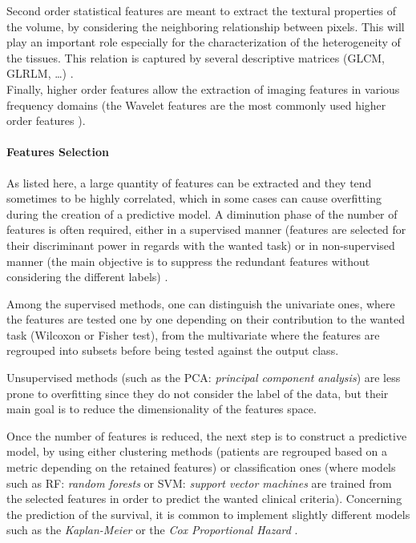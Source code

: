 \documentclass[]{article}
\let\oldparagraph\paragraph
\renewcommand{\paragraph}[1]{\oldparagraph{#1}\mbox{}}
\begin{document}
Second order statistical features are meant to extract the textural
properties of the volume, by considering the neighboring relationship
between pixels. This will play an important role especially for the
characterization of the heterogeneity of the tissues. This relation is
captured by several descriptive matrices (GLCM, GLRLM,
\ldots{}) \cite{Parekh2016}.\\
Finally, higher order features allow the extraction of imaging features
in various frequency domains (the Wavelet features are the most commonly
used higher order features \cite{Thawani2018}).

\paragraph{Features Selection}\label{features-selection}

As listed here, a large quantity of features can be extracted and they
tend sometimes to be highly correlated, which in some cases can cause
overfitting during the creation of a predictive model. A diminution
phase of the number of features is often required, either in a
supervised manner (features are selected for their discriminant power in
regards with the wanted task) or in non-supervised manner (the main
objective is to suppress the redundant features without considering the
different labels) \cite{Parekh2016}.

Among the supervised methods, one can distinguish the univariate ones,
where the features are tested one by one depending on their contribution
to the wanted task (Wilcoxon or Fisher test), from the multivariate
where the features are regrouped into subsets before being tested
against the output class.

Unsupervised methods (such as the PCA: \emph{principal component
analysis}) are less prone to overfitting since they do not consider the
label of the data, but their main goal is to reduce the dimensionality
of the features space.

Once the number of features is reduced, the next step is to construct a
predictive model, by using either clustering methods (patients are
regrouped based on a metric depending on the retained features) or
classification ones (where models such as RF: \emph{random forests} or
SVM: \emph{support vector machines} are trained from the selected
features in order to predict the wanted clinical criteria). Concerning
the prediction of the survival, it is common to implement slightly
different models such as the \emph{Kaplan-Meier} or the \emph{Cox
Proportional Hazard} \cite{Oikonomou2018}.
\end{document}
